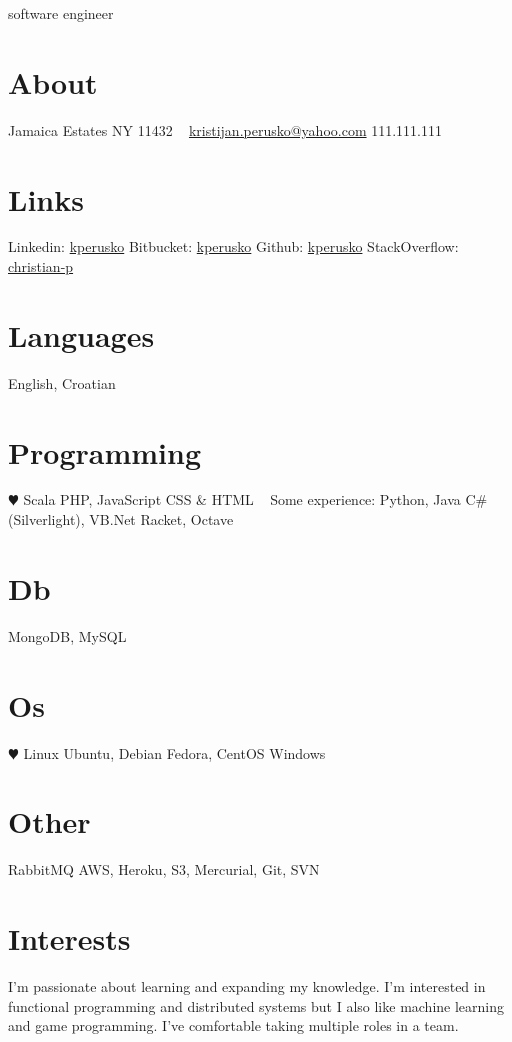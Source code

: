 \documentclass[print]{friggeri-cv}
\begin{document}
       {software engineer}


\begin{aside}
  \section{About}
    Jamaica Estates
    NY 11432
~
    \href{mailto:kristijan.perusko@yahoo.com}{kristijan.perusko@yahoo.com}
    111.111.111
  \section{Links}  
    Linkedin:  \href{https://www.linkedin.com/in/kperusko}{kperusko}
    Bitbucket: \href{https://bitbucket.org/kperusko}{kperusko}    
    Github: \href{https://github.com/kperuska}{kperusko}
    StackOverflow: \href{http://stackoverflow.com/users/515053/christian-p}{christian-p}
  \section{Languages}
    English, Croatian
  \section{Programming}
    {\color{red} $\varheartsuit$} Scala
    PHP, JavaScript
    CSS \& HTML
~     
    Some experience:
    Python, Java
    C\# (Silverlight), VB.Net
    Racket, Octave
  \section{Db}
    MongoDB, MySQL
  \section{Os}
    {\color{red} $\varheartsuit$} Linux 
    Ubuntu, Debian 
    Fedora, CentOS
    Windows
  \section{Other}
    RabbitMQ
    AWS, Heroku, S3, 
    Mercurial, Git, SVN
\end{aside}

\section{Interests}

I'm passionate about learning and expanding my knowledge. I'm interested in functional programming and distributed systems but I also like machine learning and game programming.
I've comfortable taking multiple roles in a team.
\end{document}

